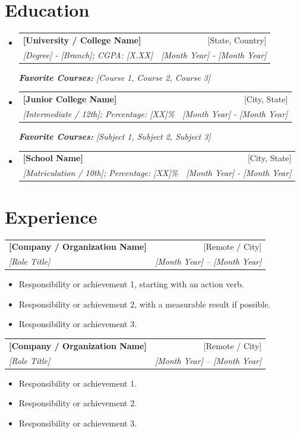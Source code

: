 \documentclass[a4paper,10pt]{article}
\makeatletter
\def\color#1{}%
\newcommand{\resumeSubheading}[4]{
  \vspace{-1pt}\item
    \begin{tabular*}{0.97\textwidth}{l@{\extracolsep{\fill}}r}
      \textbf{#1} & #2 \\
      \textit{#3} & \textit{#4} \\
    \end{tabular*}\vspace{-5pt}
}
\newcommand{\resumeSubHeadingListStart}{\begin{itemize}[leftmargin=*]}
\newcommand{\resumeSubHeadingListEnd}{\end{itemize}}
\newcommand{\resumeItemListStart}{\begin{itemize}}
\newcommand{\resumeItemListEnd}{\end{itemize}\vspace{-5pt}}
\makeatother
\begin{document}
\section{\color{BlueViolet} Education}
  \resumeSubHeadingListStart
    \resumeSubheading
      {\color{Blue} [University / College Name]}{[State, Country]}
      {[Degree] - [Branch];  CGPA: [X.XX]}{[Month Year] - [Month Year]}
      {\scriptsize \textit{ \footnotesize{\newline{}\textbf{Favorite Courses:} [Course 1, Course 2, Course 3]}}}
      \resumeSubheading
      {\color{Blue} [Junior College Name]}{[City, State]}
      {[Intermediate / 12th]; Percentage: [XX]\%}{[Month Year] - [Month Year]}
      {\scriptsize \textit{ \footnotesize{\newline{}\textbf{Favorite Courses:} [Subject 1, Subject 2, Subject 3]}}}
      \resumeSubheading
      {\color{Blue} [School Name]}{[City, State]}
      {[Matriculation / 10th]; Percentage: [XX]\%}{[Month Year] - [Month Year]}
    \resumeSubHeadingListEnd

\vspace{-2pt}
\section{\color{BlueViolet} Experience}
\resumeSubheading
		{\color{Blue} [Company / Organization Name]}{[Remote / City]}
		{[Role Title]}{[Month Year] -- [Month Year]}
		\resumeItemListStart
    \item [Responsibility or achievement 1, starting with an action verb.]
    \item [Responsibility or achievement 2, with a measurable result if possible.]
    \item [Responsibility or achievement 3.]
\resumeItemListEnd

\vspace{0pt}
    \resumeSubheading
		{\color{Blue} [Company / Organization Name]}{[Remote / City]}
		{[Role Title]}{[Month Year] -- [Month Year]}
		\resumeItemListStart
    \item [Responsibility or achievement 1.]
    \item [Responsibility or achievement 2.]
    \item [Responsibility or achievement 3.]
\resumeItemListEnd
\vspace{-10pt}

\vspace{5pt}
\end{document}
